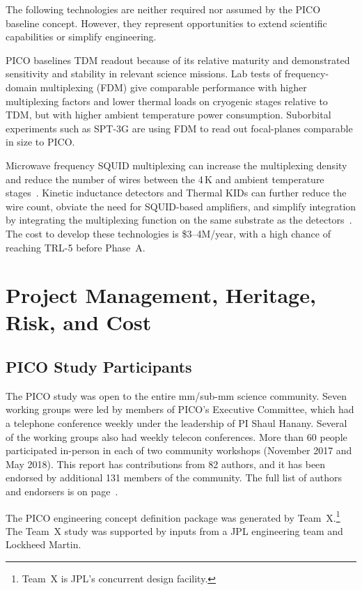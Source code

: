 The following technologies are neither required nor assumed by the PICO baseline concept. However, they represent opportunities to extend scientific capabilities or simplify engineering.

PICO baselines TDM readout because of its relative maturity and demonstrated sensitivity and stability in relevant science missions. Lab tests of frequency-domain multiplexing (FDM) give comparable performance with higher multiplexing factors and lower thermal loads on cryogenic stages relative to TDM, but with higher ambient temperature power consumption. Suborbital experiments such as SPT-3G are using FDM to read out focal-planes comparable in size to PICO.

Microwave frequency SQUID multiplexing can increase the multiplexing density and reduce the number of wires between the 4\,K and ambient temperature stages~\citep{Dober2017,Irwin2004}. Kinetic inductance detectors and Thermal KIDs can further reduce the wire count, obviate the need for SQUID-based amplifiers, and simplify integration by integrating the multiplexing function on the same substrate as the detectors~\citep{McCarrick2018,Steinbach2018,Johnson2018}. The cost to develop these technologies is \$3--4M/year, with a high chance of reaching TRL-5 before Phase~A.

\section{Project Management, Heritage, Risk, and Cost}
\label{sec:project_management} %

\subsection{PICO Study Participants}
\label{sec:study_participants} %

The PICO study was open to the entire mm/sub-mm science community. Seven working groups were led by members of PICO's Executive Committee, which had a telephone conference weekly under the leadership of PI Shaul Hanany. Several of the working groups also had weekly telecon conferences. More than 60 people participated in-person in each of two community workshops (November 2017 and May 2018). This report has contributions from 82 authors, and it has been endorsed by additional 131 members of the community.  The full list of authors and endorsers is on page~\pageref{authorlist}.


The PICO engineering concept definition package was generated by Team~X.\footnote{\label{teamx} Team~X is JPL's concurrent design facility.} The Team~X study was supported by inputs from a JPL engineering team and Lockheed Martin.


